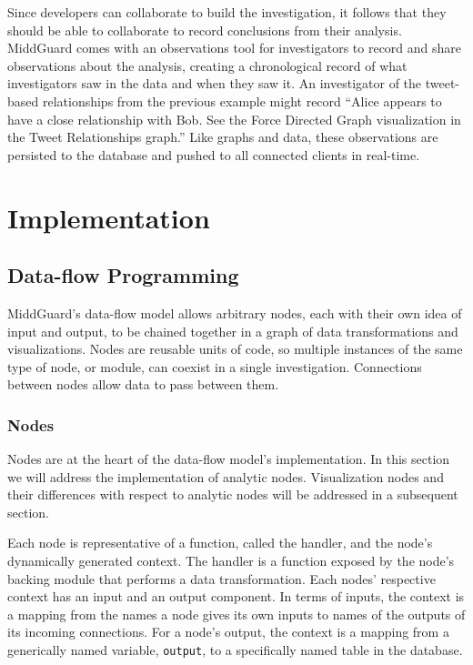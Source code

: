 \documentclass[midd]{thesis}
\begin{document}
Since developers can collaborate to build the investigation, it follows that
they should be able to collaborate to record conclusions from their analysis.
MiddGuard comes with an observations tool for investigators to record and share
observations about the analysis, creating a chronological record of what
investigators saw in the data and when they saw it. An investigator of the
tweet-based relationships from the previous example might record ``Alice appears
to have a close relationship with Bob. See the Force Directed Graph
visualization in the Tweet Relationships graph.'' Like graphs and data, these
observations are persisted to the database and pushed to all connected clients
in real-time.

\chapter{Implementation}

\section{Data-flow Programming}

MiddGuard's data-flow model allows arbitrary nodes, each with their own idea of
input and output, to be chained together in a graph of data transformations and
visualizations. Nodes are reusable units of code, so multiple instances of the
same type of node, or module, can coexist in a single investigation. Connections
between nodes allow data to pass between them.

\subsection{Nodes}

Nodes are at the heart of the data-flow model's implementation. In this section
we will address the implementation of analytic nodes. Visualization nodes and
their differences with respect to analytic nodes will be addressed in a
subsequent section.

Each node is representative of a function, called the handler, and the node's
dynamically generated context. The handler is a function exposed by the node's
backing module that performs a data transformation. Each nodes' respective
context has an input and an output component. In terms of inputs, the context is
a mapping from the names a node gives its own inputs to names of the outputs of
its incoming connections. For a node's output, the context is a mapping from a
generically named variable, \texttt{output}, to a specifically named table in
the database.
\end{document}
